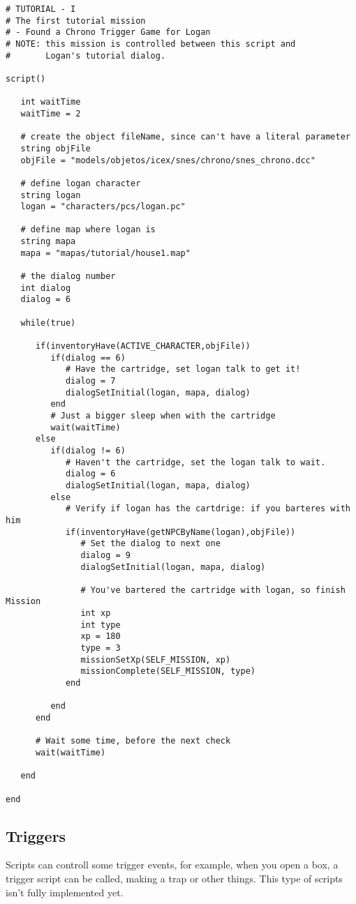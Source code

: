 \documentclass[ letterpaper,12pt]{article}
\begin{document}
\begin{verbatim}
# TUTORIAL - I
# The first tutorial mission
# - Found a Chrono Trigger Game for Logan
# NOTE: this mission is controlled between this script and
#       Logan's tutorial dialog.

script()

   int waitTime
   waitTime = 2

   # create the object fileName, since can't have a literal parameter
   string objFile
   objFile = "models/objetos/icex/snes/chrono/snes_chrono.dcc"

   # define logan character
   string logan
   logan = "characters/pcs/logan.pc"   

   # define map where logan is
   string mapa
   mapa = "mapas/tutorial/house1.map"

   # the dialog number
   int dialog
   dialog = 6
   
   while(true)

      if(inventoryHave(ACTIVE_CHARACTER,objFile)) 
         if(dialog == 6)
            # Have the cartridge, set logan talk to get it!
            dialog = 7
            dialogSetInitial(logan, mapa, dialog)            
         end
         # Just a bigger sleep when with the cartridge
         wait(waitTime)
      else 
         if(dialog != 6)
            # Haven't the cartridge, set the logan talk to wait.
            dialog = 6
            dialogSetInitial(logan, mapa, dialog)
         else
            # Verify if logan has the cartdrige: if you barteres with him
            if(inventoryHave(getNPCByName(logan),objFile))
               # Set the dialog to next one
               dialog = 9
               dialogSetInitial(logan, mapa, dialog)

               # You've bartered the cartridge with logan, so finish Mission
               int xp
               int type
               xp = 180
               type = 3
               missionSetXp(SELF_MISSION, xp)
               missionComplete(SELF_MISSION, type)
            end

         end   
      end

      # Wait some time, before the next check
      wait(waitTime)

   end

end
\end{verbatim}

\subsection{Triggers}

Scripts can controll some trigger events, for example, when you open a box, a
trigger script can be called, making a trap or other things. This type of
scripts isn't fully implemented yet.
\end{document}
